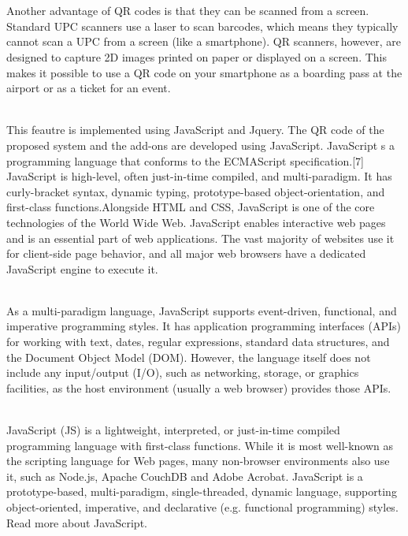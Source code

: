 \documentclass[12pt,a4paper]{report}
\begin{document}
\\
\\
\par
Another advantage of QR codes is that they can be scanned from a screen. Standard UPC scanners use a laser to scan barcodes, which means they typically cannot scan a UPC from a screen (like a smartphone). QR scanners, however, are designed to capture 2D images printed on paper or displayed on a screen. This makes it possible to use a QR code on your smartphone as a boarding pass at the airport or as a ticket for an event.
\\
\\
\par
This feautre is implemented using JavaScript and Jquery. 
The QR code of the proposed system and the add-ons are developed using JavaScript. JavaScript s a programming language that conforms to the ECMAScript specification.[7] JavaScript is high-level, often just-in-time compiled, and multi-paradigm. It has curly-bracket syntax, dynamic typing, prototype-based object-orientation, and first-class functions.Alongside HTML and CSS, JavaScript is one of the core technologies of the World Wide Web. JavaScript enables interactive web pages and is an essential part of web applications. The vast majority of websites use it for client-side page behavior, and all major web browsers have a dedicated JavaScript engine to execute it.
\\
\\
\par
As a multi-paradigm language, JavaScript supports event-driven, functional, and imperative programming styles. It has application programming interfaces (APIs) for working with text, dates, regular expressions, standard data structures, and the Document Object Model (DOM). However, the language itself does not include any input/output (I/O), such as networking, storage, or graphics facilities, as the host environment (usually a web browser) provides those APIs.
\\
\\
\par
JavaScript (JS) is a lightweight, interpreted, or just-in-time compiled programming language with first-class functions. While it is most well-known as the scripting language for Web pages, many non-browser environments also use it, such as Node.js, Apache CouchDB and Adobe Acrobat. JavaScript is a prototype-based, multi-paradigm, single-threaded, dynamic language, supporting object-oriented, imperative, and declarative (e.g. functional programming) styles. Read more about JavaScript.
\end{document}
